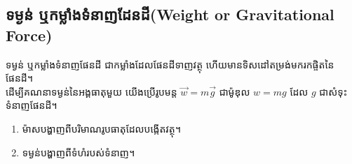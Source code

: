 \subsection{ទម្ងន់ ឬកម្លាំងទំនាញដែនដី{\en(Weight or Gravitational Force)}}
\begin{definition}
	 ទម្ងន់ ឬកម្លាំងទំនាញផែនដី ជាកម្លាំងដែលផែនដីទាញវត្ថុ ហើយមានទិសដៅតម្រង់មករកផ្ចិតនៃផែនដី។\\
	 ដើម្បីគណនាទម្ងន់នៃអង្គធាតុមួយ យើងប្រើរូបមន្ត $\vec{w}=m\vec{g}$ ជាម៉ូឌុល $w=mg$ ដែល $g$ ជាសំទុះទំនាញផែនដី។
\end{definition}
\begin{remark}
	\begin{enumerate}[k,2]
		\item ម៉ាសបង្ហាញពីបរិមាណរូបធាតុដែលបង្កើតវត្ថុ។
		\item ទម្ងន់បង្ហាញពីទំហំរបស់ទំនាញ។
	\end{enumerate}
\end{remark}
